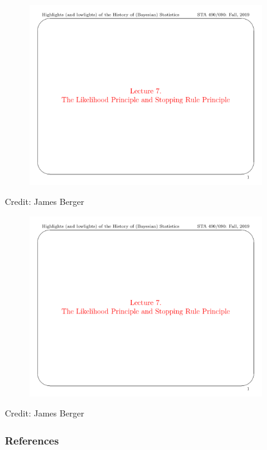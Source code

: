 \documentclass[xcolor=dvipsnames]{beamer}
\begin{document}
\begin{frame}[plain]
    \begin{figure}
        \centering
        \includegraphics[page=10, width=0.9\textwidth, trim=0 0.45in 0 0.6in, clip]{figures/History-Lecture 7.pdf}
    \end{figure}
    
\footnotesize{Credit: James Berger}
\end{frame}

\begin{frame}[plain]
    \begin{figure}
        \centering
        \includegraphics[page=11, width=0.9\textwidth, trim=0 0.45in 0 0.6in, clip]{figures/History-Lecture 7.pdf}
    \end{figure}
    
\footnotesize{Credit: James Berger}
\end{frame}

\begin{frame}[allowframebreaks]
        \frametitle{References}
        
        
\end{frame}
\end{document}

